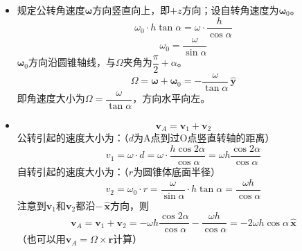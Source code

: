 \documentclass[a4paper,fontset=windows]{ctexart}
\begin{document}
\begin{itemize}
        \bigskip
        \item[4.4.(1)]
        规定公转角速度$\bm{\omega}$方向竖直向上，即$+z$方向；设自转角速度为$\bm{\omega}_0$。
        \[
        \omega_0 \cdot h\tan\alpha = \omega \cdot \frac{h}{\cos\alpha}
        \]
        \[
        \omega_0 = \frac{\omega}{\sin\alpha}
        \]
        $\bm{\omega}_0$方向沿圆锥轴线，与$\bm{\varOmega}$夹角为$\dfrac{\pi}{2}+\alpha$。
        \[
        \bm{\varOmega} = \bm{\omega} + \bm{\omega}_0 = -\frac{\omega}{\tan\alpha}\,\bm{\hat{y}}
        \]
        即角速度大小为$\varOmega = \dfrac{\omega}{\tan\alpha}$，方向水平向左。

        \medskip
        \item[4.4.(2)]
        \[
        \bm{v}_A = \bm{v}_1 + \bm{v}_2
        \]
        公转引起的速度大小为：（$d$为A点到过O点竖直转轴的距离）
        \[
        v_1 = \omega \cdot d = \omega \cdot \frac{h\cos{2\alpha}}{\cos\alpha} = \omega h \frac{\cos{2\alpha}}{\cos\alpha}
        \]
        自转引起的速度大小为：（$r$为圆锥体底面半径）
        \[
        v_2 = \omega_0 \cdot r = \frac{\omega}{\sin\alpha} \cdot h\tan\alpha = \frac{\omega h}{\cos\alpha}
        \]
        注意到$\bm{v}_1$和$\bm{v}_2$都沿$-\,\bm{\hat{x}}$方向，则
        \[
        \bm{v}_A = \bm{v}_1 + \bm{v}_2 = -\omega h \frac{\cos{2\alpha}}{\cos\alpha} - \frac{\omega h}{\cos\alpha} = -2\omega h\cos\alpha\,\bm{\hat{x}}
        \]
        （也可以用$\bm{v}_A = \bm{\varOmega} \times \bm{r}$计算）


\end{itemize}
\end{document}
